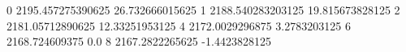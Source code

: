 0 2195.457275390625 26.732666015625
1 2188.540283203125 19.815673828125
2 2181.05712890625 12.33251953125
4 2172.0029296875 3.2783203125
6 2168.724609375 0.0
8 2167.2822265625 -1.4423828125
